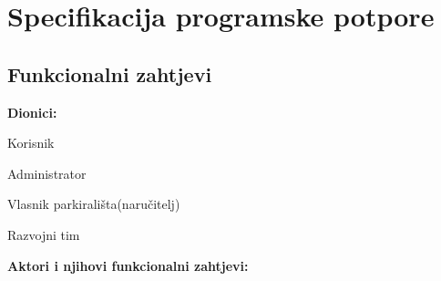 \chapter{Specifikacija programske potpore}
		
	\section{Funkcionalni zahtjevi}
			
			
			\noindent \textbf{Dionici:}
			
			
			\begin{packed_enum}
				
				\item Korisnik
				\item Administrator				
				\item Vlasnik parkirališta(naručitelj)
				\item Razvojni tim
				
			\end{packed_enum}
			
			\noindent \textbf{Aktori i njihovi funkcionalni zahtjevi:}
			
